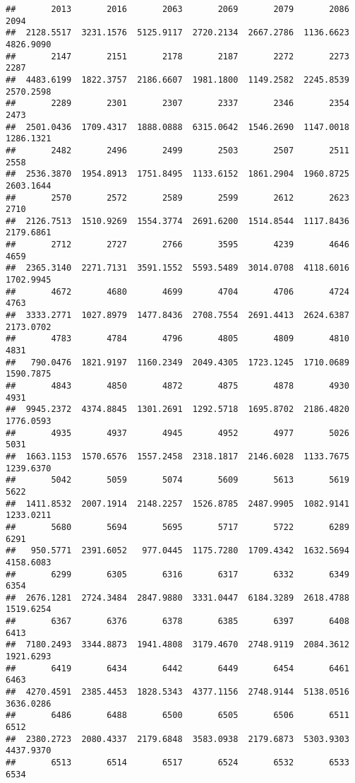 \documentclass[
]{article}
\begin{document}
\begin{verbatim}
##       2013       2016       2063       2069       2079       2086       2094 
##  2128.5517  3231.1576  5125.9117  2720.2134  2667.2786  1136.6623  4826.9090 
##       2147       2151       2178       2187       2272       2273       2287 
##  4483.6199  1822.3757  2186.6607  1981.1800  1149.2582  2245.8539  2570.2598 
##       2289       2301       2307       2337       2346       2354       2473 
##  2501.0436  1709.4317  1888.0888  6315.0642  1546.2690  1147.0018  1286.1321 
##       2482       2496       2499       2503       2507       2511       2558 
##  2536.3870  1954.8913  1751.8495  1133.6152  1861.2904  1960.8725  2603.1644 
##       2570       2572       2589       2599       2612       2623       2710 
##  2126.7513  1510.9269  1554.3774  2691.6200  1514.8544  1117.8436  2179.6861 
##       2712       2727       2766       3595       4239       4646       4659 
##  2365.3140  2271.7131  3591.1552  5593.5489  3014.0708  4118.6016  1702.9945 
##       4672       4680       4699       4704       4706       4724       4763 
##  3333.2771  1027.8979  1477.8436  2708.7554  2691.4413  2624.6387  2173.0702 
##       4783       4784       4796       4805       4809       4810       4831 
##   790.0476  1821.9197  1160.2349  2049.4305  1723.1245  1710.0689  1590.7875 
##       4843       4850       4872       4875       4878       4930       4931 
##  9945.2372  4374.8845  1301.2691  1292.5718  1695.8702  2186.4820  1776.0593 
##       4935       4937       4945       4952       4977       5026       5031 
##  1663.1153  1570.6576  1557.2458  2318.1817  2146.6028  1133.7675  1239.6370 
##       5042       5059       5074       5609       5613       5619       5622 
##  1411.8532  2007.1914  2148.2257  1526.8785  2487.9905  1082.9141  1233.0211 
##       5680       5694       5695       5717       5722       6289       6291 
##   950.5771  2391.6052   977.0445  1175.7280  1709.4342  1632.5694  4158.6083 
##       6299       6305       6316       6317       6332       6349       6354 
##  2676.1281  2724.3484  2847.9880  3331.0447  6184.3289  2618.4788  1519.6254 
##       6367       6376       6378       6385       6397       6408       6413 
##  7180.2493  3344.8873  1941.4808  3179.4670  2748.9119  2084.3612  1921.6293 
##       6419       6434       6442       6449       6454       6461       6463 
##  4270.4591  2385.4453  1828.5343  4377.1156  2748.9144  5138.0516  3636.0286 
##       6486       6488       6500       6505       6506       6511       6512 
##  2380.2723  2080.4337  2179.6848  3583.0938  2179.6873  5303.9303  4437.9370 
##       6513       6514       6517       6524       6532       6533       6534 

\end{verbatim}
\end{document}
